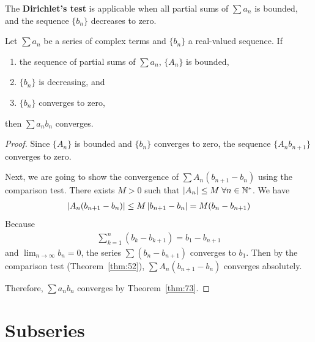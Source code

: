\documentclass[thmcnt=section, 12pt]{my-elegantbook}
\begin{document}

The \textbf{Dirichlet's test}
is applicable when all partial sums of $\sum a_n$ is bounded,
and the sequence $\{b_n\}$ decreases to zero.

\begin{theorem} \label{thm:74}
	Let $\sum a_n$ be a series of complex terms 
	and $\{b_n\}$ a real-valued sequence.
	If 
	\begin{enumerate}
		\item the sequence of partial sums of $\sum a_n$, 
			$\{A_n\}$ is bounded,
		\item $\{b_n\}$ is decreasing, and 
		\item $\{b_n\}$ converges to zero,
	\end{enumerate}
	then $\sum a_n b_n$ converges.
\end{theorem}

\begin{proof}
	Since $\{A_n\}$ is bounded and $\{b_n\}$ converges to zero,
	the sequence $\{A_n b_{n+1}\}$ converges to zero.
	
	Next, we are going to show the convergence of 
	$\sum A_n(b_{n+1} - b_n)$ using the comparison test.
	There exists $M > 0$ such that 
	$\left\lvert A_n \right\rvert \leq M \; \forall n \in \mathbb{N}^\ast$.
	We have 
	\begin{align*}
		\left\lvert A_n (b_{n+1} - b_n) \right\rvert
		\leq M \left\lvert b_{n+1} - b_{n} \right\rvert
		= M (b_n - b_{n+1})
	\end{align*}
	Because 
	\begin{align*}
		\sum_{k=1}^n (b_k - b_{k+1})
		= b_1 - b_{n+1}
	\end{align*}
	and $\lim_{n \to \infty} b_n = 0$,
	the series $\sum (b_n - b_{n+1})$ converges to $b_1$.
	Then by the comparison test (Theorem~\ref{thm:52}), 
	$\sum A_n (b_{n+1} - b_{n})$ converges absolutely.

	Therefore, $\sum a_n b_n$ converges by Theorem~\ref{thm:73}.
\end{proof}


\section{Subseries}
\end{document}
